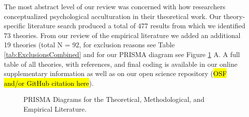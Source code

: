 The most abstract level of our review was concerned with how researchers
conceptualized psychological acculturation in their theoretical work.
Our theory-specific literature search produced a total of 477 results
from which we identified 73 theories. From our review of the empirical
literature we added an additional 19 theories (total N = 92, for
exclusion reasons see Table \ref{tab:ExclusionsCombined} and for our
PRISMA diagram see Figure \ref{fig:PrismaCombined} A. A full table of
all theories, with references, and final coding is available in our
online supplementary information as well as on our open science
repository (\hl{OSF and/or GitHub citation here}).

\begin{figure}[h]
\centering
\caption{PRISMA Diagrams for the Theoretical, Methodological, and Empirical Literature.}
\label{fig:PrismaCombined}
\end{figure}

